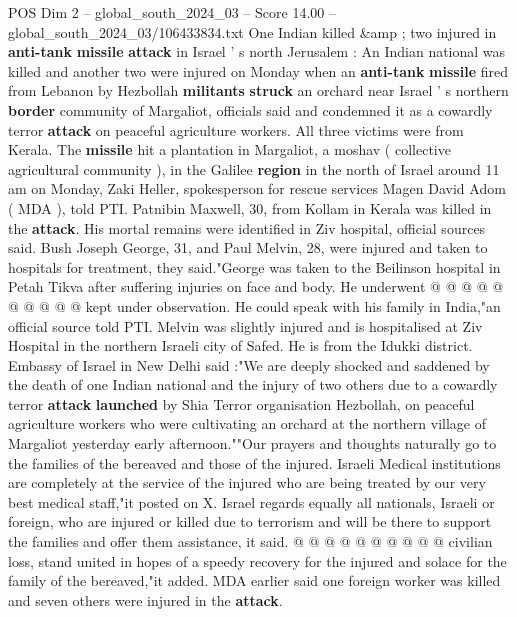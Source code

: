 \begin{textsample}{POS Dim 2 – global\_south\_2024\_03 – Score 14.00 – global\_south\_2024\_03/106433834.txt}  \label{ex:f2_pos_336}
One Indian killed \&amp ; two injured in \textbf{anti-tank} \textbf{missile} \textbf{attack} in Israel ' s north Jerusalem : An Indian national was killed and another two were injured on Monday when an \textbf{anti-tank} \textbf{missile} fired from Lebanon by Hezbollah \textbf{militants} \textbf{struck} an orchard near Israel ' s northern \textbf{border} community of Margaliot, officials said and condemned it as a cowardly terror \textbf{attack} on peaceful agriculture workers.
All three victims were from Kerala.
The \textbf{missile} hit a plantation in Margaliot, a moshav ( collective agricultural community ), in the Galilee \textbf{region} in the north of Israel around 11 am on Monday, Zaki Heller, spokesperson for rescue services Magen David Adom ( MDA ), told PTI.
Patnibin Maxwell, 30, from Kollam in Kerala was killed in the \textbf{attack}.
His mortal remains were identified in Ziv hospital, official sources said.
Bush Joseph George, 31, and Paul Melvin, 28, were injured and taken to hospitals for treatment, they said."George was taken to the Beilinson hospital in Petah Tikva after suffering injuries on face and body.
He underwent @ @ @ @ @ @ @ @ @ @ kept under observation.
He could speak with his family in India,"an official source told PTI.
Melvin was slightly injured and is hospitalised at Ziv Hospital in the northern Israeli city of Safed.
He is from the Idukki district.
Embassy of Israel in New Delhi said :"We are deeply shocked and saddened by the death of one Indian national and the injury of two others due to a cowardly terror \textbf{attack} \textbf{launched} by Shia Terror organisation Hezbollah, on peaceful agriculture workers who were cultivating an orchard at the northern village of Margaliot yesterday early afternoon.""Our prayers and thoughts naturally go to the families of the bereaved and those of the injured.
Israeli Medical institutions are completely at the service of the injured who are being treated by our very best medical staff,"it posted on X.
Israel regards equally all nationals, Israeli or foreign, who are injured or killed due to terrorism and will be there to support the families and offer them assistance, it said. @ @ @ @ @ @ @ @ @ @ civilian loss, stand united in hopes of a speedy recovery for the injured and solace for the family of the bereaved,"it added.
MDA earlier said one foreign worker was killed and seven others were injured in the \textbf{attack}.

\end{textsample}
